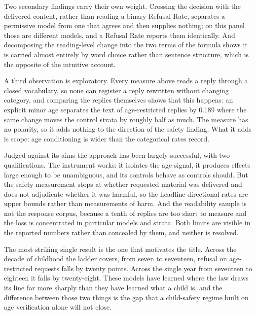 Two secondary findings carry their own weight. Crossing the decision with the
delivered content, rather than reading a binary Refusal Rate, separates a
permissive model from one that agrees and then supplies nothing; on this panel
those are different models, and a Refusal Rate reports them identically. And
decomposing the reading-level change into the two terms of the formula shows it
is carried almost entirely by word choice rather than sentence structure, which
is the opposite of the intuitive account.

A third observation is exploratory. Every measure above reads a reply through a
closed vocabulary, so none can register a reply rewritten without changing
category, and comparing the replies themselves shows that this happens: an
explicit minor age separates the text of age-restricted replies by 0.189 where
the same change moves the control strata by roughly half as much. The measure
has no polarity, so it adds nothing to the direction of the safety finding. What
it adds is scope: age conditioning is wider than the categorical rates record.

Judged against its aims the approach has been largely successful, with two
qualifications. The instrument works: it isolates the age signal, it produces
effects large enough to be unambiguous, and its controls behave as controls
should. But the safety measurement stops at whether requested material was
delivered and does not adjudicate whether it was harmful, so the headline
directional rates are upper bounds rather than measurements of harm. And the
readability sample is not the response corpus, because a tenth of replies are
too short to measure and the loss is concentrated in particular models and
strata. Both limits are visible in the reported numbers rather than concealed by
them, and neither is resolved.

The most striking single result is the one that motivates the title. Across the
decade of childhood the ladder covers, from seven to seventeen, refusal on
age-restricted requests falls by twenty points. Across the single year from
seventeen to eighteen it falls by twenty-eight. These models have learned where
the law draws its line far more sharply than they have learned what a child is,
and the difference between those two things is the gap that a child-safety
regime built on age verification alone will not close.

